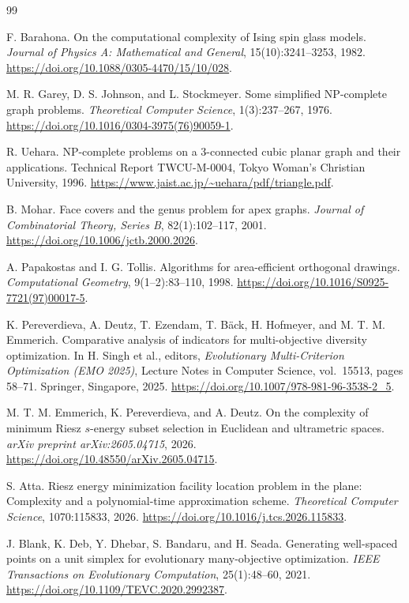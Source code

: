 \documentclass[12pt,a4paper]{article}
\begin{document}
\begin{thebibliography}{99}


F. Barahona.
On the computational complexity of Ising spin glass models.
\emph{Journal of Physics A: Mathematical and General},
15(10):3241--3253, 1982.
\url{https://doi.org/10.1088/0305-4470/15/10/028}.

M. R. Garey, D. S. Johnson, and L. Stockmeyer.
Some simplified NP-complete graph problems.
\emph{Theoretical Computer Science},
1(3):237--267, 1976.
\url{https://doi.org/10.1016/0304-3975(76)90059-1}.

R. Uehara.
NP-complete problems on a 3-connected cubic planar graph and their applications.
Technical Report TWCU-M-0004, Tokyo Woman's Christian University, 1996.
\url{https://www.jaist.ac.jp/~uehara/pdf/triangle.pdf}.

B. Mohar.
Face covers and the genus problem for apex graphs.
\emph{Journal of Combinatorial Theory, Series B},
82(1):102--117, 2001.
\url{https://doi.org/10.1006/jctb.2000.2026}.

A. Papakostas and I. G. Tollis.
Algorithms for area-efficient orthogonal drawings.
\emph{Computational Geometry},
9(1--2):83--110, 1998.
\url{https://doi.org/10.1016/S0925-7721(97)00017-5}.

K. Pereverdieva, A. Deutz, T. Ezendam, T. B\"ack,
H. Hofmeyer, and M. T. M. Emmerich.
Comparative analysis of indicators for multi-objective diversity optimization.
In H. Singh et al., editors,
\emph{Evolutionary Multi-Criterion Optimization (EMO 2025)},
Lecture Notes in Computer Science, vol.~15513,
pages 58--71. Springer, Singapore, 2025.
\url{https://doi.org/10.1007/978-981-96-3538-2_5}.

M. T. M. Emmerich, K. Pereverdieva, and A. Deutz.
On the complexity of minimum Riesz $s$-energy subset selection in Euclidean and ultrametric spaces.
\emph{arXiv preprint arXiv:2605.04715}, 2026.
\url{https://doi.org/10.48550/arXiv.2605.04715}.

S. Atta.
Riesz energy minimization facility location problem in the plane: Complexity and a polynomial-time approximation scheme.
\emph{Theoretical Computer Science}, 1070:115833, 2026.
\url{https://doi.org/10.1016/j.tcs.2026.115833}.



J. Blank, K. Deb, Y. Dhebar, S. Bandaru, and H. Seada.
Generating well-spaced points on a unit simplex for evolutionary many-objective optimization.
\emph{IEEE Transactions on Evolutionary Computation},
25(1):48--60, 2021.
\url{https://doi.org/10.1109/TEVC.2020.2992387}.


\end{thebibliography}
\end{document}
